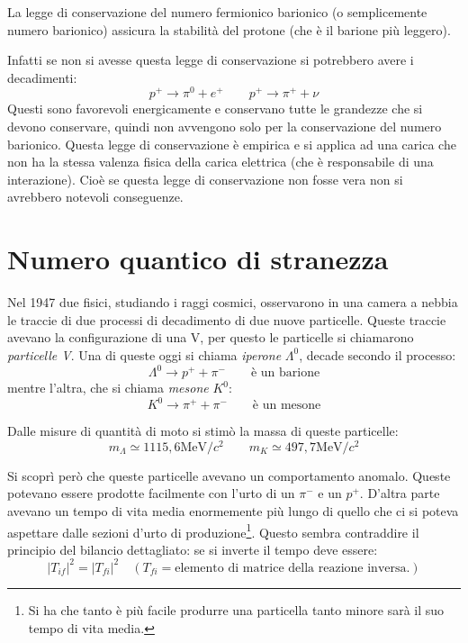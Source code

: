 La legge di conservazione del numero fermionico barionico (o semplicemente 
numero barionico) assicura la
stabilità del protone (che è il barione più leggero).

Infatti se non si avesse questa legge di conservazione si potrebbero avere i 
decadimenti:
\[
p^+\rightarrow \pi^0+e^+\qquad p^+\rightarrow \pi^++\nu
\]
Questi sono favorevoli energicamente e conservano tutte le grandezze che si 
devono conservare, quindi non
avvengono solo per la conservazione del numero barionico.
Questa legge di conservazione è empirica e si applica ad una carica che non ha 
la stessa valenza fisica della
carica elettrica (che è responsabile di una interazione).
Cioè se questa legge di conservazione non fosse vera non si avrebbero notevoli 
conseguenze.

\section{Numero quantico di stranezza}
Nel 1947 due fisici, studiando i raggi cosmici, osservarono in una camera a
nebbia le traccie di due processi di decadimento di due nuove particelle.
Queste traccie avevano la configurazione di una V, per questo le particelle si
chiamarono \textit{particelle V}.
Una di queste oggi si chiama \textit{iperone} $\Lambda^0$, decade secondo il
processo:
\[
\Lambda^0\rightarrow p^++\pi^-\qquad\text{è un barione}
\]
mentre l'altra, che si chiama \textit{mesone} $K^0$:
\[
K^0\rightarrow \pi^++\pi^-\qquad\text{è un mesone}
\]

Dalle misure di quantità di moto si stimò la massa di queste particelle:
\[
m_{\Lambda}\simeq 1115,6 \si{\mega\electronvolt}/c^2\qquad m_K\simeq 
497,7\si{\mega\electronvolt}/c^2
\]

Si scoprì però che queste particelle avevano un comportamento anomalo.
Queste potevano essere prodotte facilmente con l'urto di un $\pi^-$ e un $p^+$.
D'altra parte avevano un tempo di vita media enormemente più lungo di quello 
che
ci si poteva aspettare dalle sezioni d'urto di produzione\footnote{Si ha che
tanto è più facile produrre una particella tanto minore sarà il suo tempo di
vita media.}.
Questo sembra contraddire il principio del bilancio dettagliato: se si inverte
il tempo deve essere:
\[
|T_{if}|^2=|T_{fi}|^2\quad (T_{fi}=\text{elemento di matrice della reazione 
inversa.})
\]

